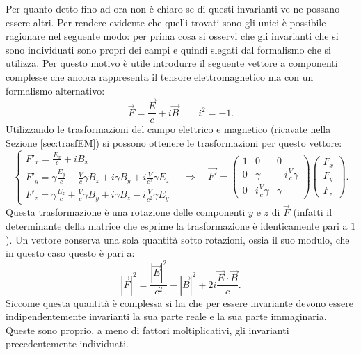 Per quanto detto fino ad ora non è chiaro se di questi invarianti ve ne possano essere altri. Per rendere evidente che quelli trovati sono gli unici è possibile ragionare nel seguente modo: per prima cosa si osservi che gli invarianti che si sono individuati sono propri dei campi e quindi slegati dal formalismo che si utilizza. Per questo motivo è utile introdurre il seguente vettore a componenti complesse che ancora rappresenta il tensore elettromagnetico ma con un formalismo alternativo:
\begin{equation*}
    \vec{F}=\frac{\vec E}{c} +i\vec B \qquad i^2=-1.
\end{equation*}
Utilizzando le trasformazioni del campo elettrico e magnetico (ricavate nella Sezione \ref{sec:trasfEM}) si possono ottenere le trasformazioni per questo vettore:
\begin{equation*}
    \begin{cases}
        F'_x=\frac{E_x}{c}+iB_x\\
        F'_y=\gamma\frac{E_y}{c}-\frac{V}{c}\gamma B_z+i\gamma B_y+i\frac{V}{c^2}\gamma E_z\\
        F'_z=\gamma\frac{E_z}{c}+\frac{V}{c}\gamma B_y+i\gamma B_z-i\frac{V}{c^2}\gamma E_y
    \end{cases}
    \quad\Rightarrow\quad
    \vec{F'}=\begin{pmatrix}
        1&0&0\\
        0&\gamma&-i\frac{V}{c}\gamma\\
        0&i\frac{V}{c}\gamma&\gamma
    \end{pmatrix}
    \begin{pmatrix}
        F_x\\F_y\\F_z
    \end{pmatrix}.
\end{equation*}
Questa trasformazione è una rotazione delle componenti $y$ e $z$ di $\vec{F}$ (infatti il determinante della matrice che esprime la trasformazione è identicamente pari a $1$). Un vettore conserva una sola quantità sotto rotazioni, ossia il suo modulo, che in questo caso questo è pari a:
\begin{equation*}
    |\vec F|^2=\frac{|\vec E|^2}{c^2}-|\vec B|^2+2i\frac{\vec E\cdot\vec B}{c}.
\end{equation*}
Siccome questa quantità è complessa si ha che per essere invariante devono essere indipendentemente invarianti la sua parte reale e la sua parte immaginaria. Queste sono proprio, a meno di fattori moltiplicativi, gli invarianti precedentemente individuati.